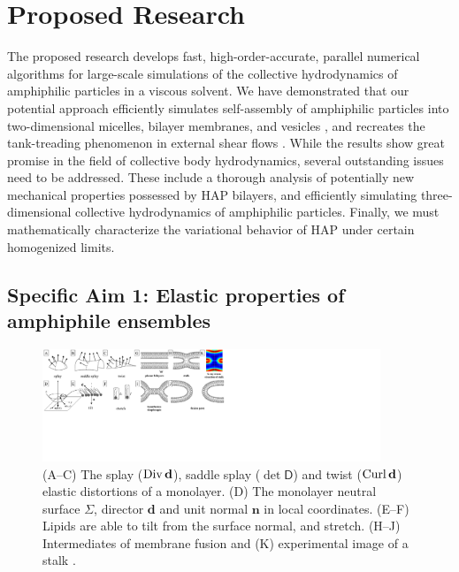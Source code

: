 \section{Proposed Research}
\label{sec:proposed-work}
The proposed research develops fast,
high-order-accurate, parallel numerical algorithms for large-scale
simulations of the collective hydrodynamics of amphiphilic particles in a viscous solvent.
%
We have demonstrated that our potential approach efficiently simulates
self-assembly of amphiphilic particles into two-dimensional micelles, bilayer membranes, and vesicles \cite{Fu19}, and
recreates the tank-treading phenomenon in external shear flows \cite{Fu20}.
%
While the results show great promise in the field of collective body hydrodynamics,
several outstanding issues need to be addressed. These include a thorough 
analysis of potentially new mechanical properties possessed by HAP bilayers, and 
efficiently simulating three-dimensional collective hydrodynamics of amphiphilic particles.
Finally, we must mathematically characterize the variational behavior of HAP under certain homogenized limits.

\subsection{Specific Aim 1: Elastic properties of amphiphile ensembles}
\label{subsec:specific_aim_1}

\begin{figure}
\begin{center}
\includegraphics[width=0.9\textwidth]{figures/SA1_fig1.pdf}
\end{center}
\caption{\footnotesize (A--C) The splay ($\operatorname{Div} \mathbf{d}$), 
saddle splay ($\det \mathsf{D}$) and twist ($\operatorname{Curl} \mathbf{d}$) elastic distortions of 
a monolayer. (D) The monolayer neutral surface $\Sigma$,  
director $\mathbf{d}$ and unit normal $\mathbf{n}$ in local coordinates.
(E--F) Lipids are able to tilt from  the surface normal, and stretch.
(H--J) Intermediates of membrane fusion and (K) experimental image of a stalk \cite{Aeffner2012}. }
\label{fig:distortions}
\end{figure}


